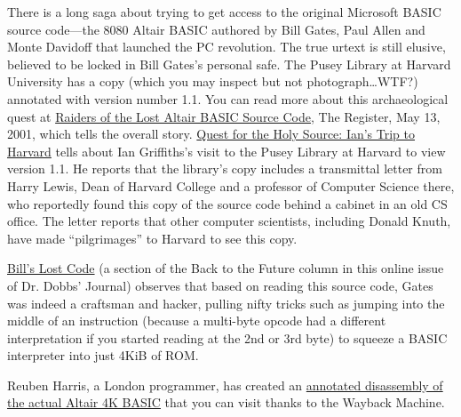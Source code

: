 There is a long saga about trying to get access to the original
Microsoft BASIC source code---the 8080 Altair BASIC authored by Bill
Gates, Paul Allen and Monte Davidoff that launched the PC revolution.
The true urtext is still elusive, believed to be locked in Bill Gates's
personal safe.
The Pusey Library at Harvard University has a copy (which you may
inspect but not photograph\ldots{}WTF?) annotated with version number
1.1.
You can read more about this archaeological quest at
\href{http://www.theregister.co.uk/2001/05/13/raiders_of_the_lost_altair/}{Raiders
of the Lost Altair BASIC Source Code}, The Register, May 13, 2001,
which tells the overall story.
\href{http://www.interact-sw.co.uk/altair/other\%20versions/ian.htm}{Quest
for the Holy Source: Ian's Trip to Harvard} tells about Ian
Griffiths's visit to the Pusey Library at Harvard to view version
1.1.
He reports that the library's copy includes a transmittal letter from
Harry Lewis, Dean of Harvard College and a professor of Computer
Science there, who reportedly found this copy of the source code behind
a cabinet in an old CS office.
The letter reports that other computer scientists, including Donald
Knuth, have made ``pilgrimages'' to Harvard to see this copy.

\href{http://www.drdobbs.com/back-to-the-future/184404733}{Bill's
  Lost Code} (a section of the Back to the Future column in this online
issue of Dr. Dobbs' Journal) observes that based on reading this source
code, Gates was indeed a craftsman and hacker, pulling nifty tricks such
as jumping into the middle of an instruction (because a multi-byte
opcode had a different interpretation if you started reading at the 2nd
or 3rd byte) to squeeze a BASIC interpreter into just 4KiB of ROM.

Reuben Harris, a London programmer, has created an
\href{http://web.archive.org/web/20011211233332/www.rjh.org.uk/altair/4k/index2.html}{annotated
disassembly of the actual Altair 4K BASIC} that you can visit thanks to the
Wayback Machine.
